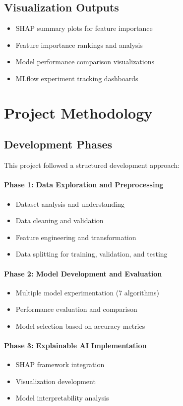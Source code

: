 \documentclass{article}
\begin{document}
\subsection{Visualization Outputs}
\begin{itemize}
    \item SHAP summary plots for feature importance
    \item Feature importance rankings and analysis
    \item Model performance comparison visualizations
    \item MLflow experiment tracking dashboards
\end{itemize}

\section{Project Methodology}

\subsection{Development Phases}
This project followed a structured development approach:

\paragraph{Phase 1: Data Exploration and Preprocessing}
\begin{itemize}
    \item Dataset analysis and understanding
    \item Data cleaning and validation
    \item Feature engineering and transformation
    \item Data splitting for training, validation, and testing
\end{itemize}

\paragraph{Phase 2: Model Development and Evaluation}
\begin{itemize}
    \item Multiple model experimentation (7 algorithms)
    \item Performance evaluation and comparison
    \item Model selection based on accuracy metrics
\end{itemize}

\paragraph{Phase 3: Explainable AI Implementation}
\begin{itemize}
    \item SHAP framework integration
    \item Visualization development
    \item Model interpretability analysis
\end{itemize}
\end{document}
